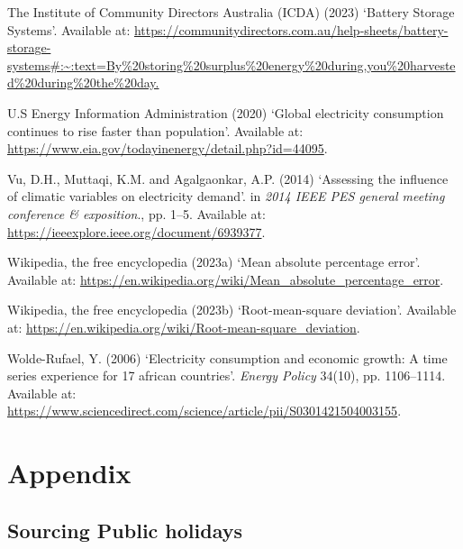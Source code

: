 \documentclass[mstat,12pt]{unswthesis}
\begin{document}
\begin{CSLReferences}{0}{0}
\leavevmode{}%
The Institute of Community Directors Australia (ICDA) (2023) {`{Battery
Storage Systems}'}. Available at:
\url{https://communitydirectors.com.au/help-sheets/battery-storage-systems\#:~:text=By\%20storing\%20surplus\%20energy\%20during,you\%20harvested\%20during\%20the\%20day.}

\leavevmode{}%
U.S Energy Information Administration (2020) {`Global electricity
consumption continues to rise faster than population'}. Available at:
\url{https://www.eia.gov/todayinenergy/detail.php?id=44095}.

\leavevmode{}%
Vu, D.H., Muttaqi, K.M. and Agalgaonkar, A.P. (2014) {`Assessing the
influence of climatic variables on electricity demand'}. in \emph{2014
IEEE PES general meeting \textbar{} conference \& exposition}., pp.
1--5. Available at: \url{https://ieeexplore.ieee.org/document/6939377}.

\leavevmode{}%
Wikipedia, the free encyclopedia (2023a) {`{Mean absolute percentage
error}'}. Available at:
\url{https://en.wikipedia.org/wiki/Mean_absolute_percentage_error}.

\leavevmode{}%
Wikipedia, the free encyclopedia (2023b) {`{Root-mean-square
deviation}'}. Available at:
\url{https://en.wikipedia.org/wiki/Root-mean-square_deviation}.

\leavevmode{}%
Wolde-Rufael, Y. (2006) {`Electricity consumption and economic growth: A
time series experience for 17 african countries'}. \emph{Energy Policy}
34(10), pp. 1106--1114. Available at:
\url{https://www.sciencedirect.com/science/article/pii/S0301421504003155}.

\end{CSLReferences}




\hypertarget{appendix}{%
\chapter*{Appendix}\label{appendix}}

\hypertarget{sourcing-public-holidays}{%
\section{Sourcing Public holidays}\label{sourcing-public-holidays}}
\end{document}
